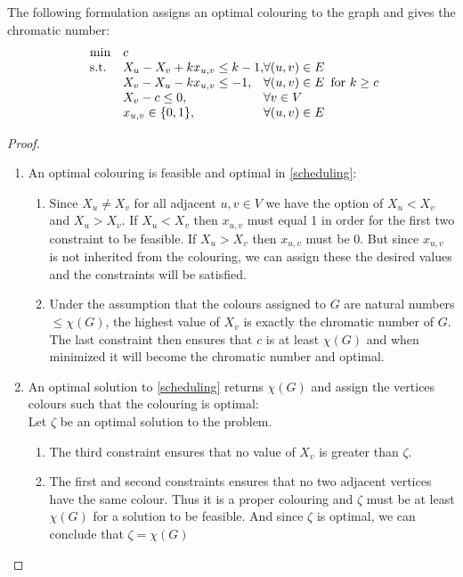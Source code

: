 \begin{proposition}
The following formulation assigns an optimal colouring to the graph and gives the chromatic number:
\begin{align}\label{scheduling}
\begin{array}{ll@{}ll}
\text{min} &c&\\
\text{s.t.} 
&X_u - X_v + kx_{u,v} \leq k-1,& \forall (u,v)\in E\\
&X_v - X_u - kx_{u,v} \leq -1,& \forall (u,v)\in E\\
&X_v - c \leq 0,& \forall v \in V\\
&x_{u,v}\in\{0,1\},& \forall (u,v) \in E\\
\end{array}
\text{for } k \geq c
\end{align}
\begin{proof}
\begin{enumerate}
\item An optimal colouring is feasible and optimal in \ref{scheduling}:\\
\begin{enumerate}
\item Since $X_u \neq X_v$ for all adjacent $u,v\in V$ we have the option of $X_u < X_v$ and $X_u > X_v$. If $X_u < X_v$ then $x_{u,v}$ must equal 1 in order for the first two constraint to be feasible. If $X_u > X_v$ then $x_{u,v}$ must be 0. But since $x_{u,v}$ is not inherited from the colouring, we can assign these the desired values and the constraints will be satisfied.
\item Under the assumption that the colours assigned to $G$ are natural numbers $\leq \chi (G)$, the highest value of $X_v$ is exactly the chromatic number of $G$. The last constraint then ensures that $c$ is at least $\chi (G)$ and when minimized it will become the chromatic number and optimal.
\end{enumerate}
\item An optimal solution to \ref{scheduling} returns $\chi(G)$ and assign the vertices colours such that the colouring is optimal:\\
Let $\zeta$ be an optimal solution to the problem.
\begin{enumerate}
\item The third constraint ensures that no value of $X_v$ is greater than $\zeta$. 
\item The first and second constraints ensures that no two adjacent vertices have the same colour. Thus it is a proper colouring and $\zeta$ must be at least $\chi (G)$ for a solution to be feasible. And since $\zeta$ is optimal, we can conclude that $\zeta = \chi (G)$
\end{enumerate}
\end{enumerate}
\end{proof}
\end{proposition}

